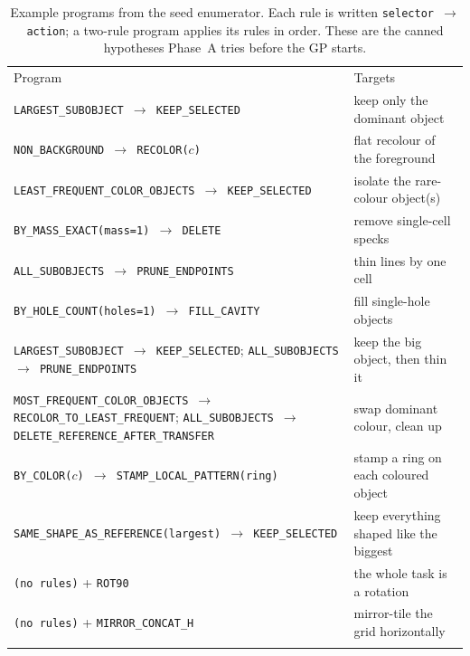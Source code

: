 \begin{table}[htbp]
\centering
\caption{Example programs from the seed enumerator. Each rule is written
\texttt{selector $\to$ action}; a two-rule program applies its rules in order. These are
the canned hypotheses Phase~A tries before the GP starts.}
\label{tab:app-gallery}
\footnotesize
\begin{tabular}{p{9.0cm}p{3.8cm}}
\hline\noalign{\smallskip}
Program & Targets \\
\noalign{\smallskip}\hline\noalign{\smallskip}
\texttt{LARGEST\_SUBOBJECT $\to$ KEEP\_SELECTED} & keep only the dominant object \\
\texttt{NON\_BACKGROUND $\to$ RECOLOR($c$)} & flat recolour of the foreground \\
\texttt{LEAST\_FREQUENT\_COLOR\_OBJECTS $\to$ KEEP\_SELECTED} & isolate the rare-colour object(s) \\
\texttt{BY\_MASS\_EXACT(mass{=}1) $\to$ DELETE} & remove single-cell specks \\
\texttt{ALL\_SUBOBJECTS $\to$ PRUNE\_ENDPOINTS} & thin lines by one cell \\
\texttt{BY\_HOLE\_COUNT(holes{=}1) $\to$ FILL\_CAVITY} & fill single-hole objects \\
\texttt{LARGEST\_SUBOBJECT $\to$ KEEP\_SELECTED};\newline
\texttt{ALL\_SUBOBJECTS $\to$ PRUNE\_ENDPOINTS} & keep the big object, then thin it \\
\texttt{MOST\_FREQUENT\_COLOR\_OBJECTS $\to$ RECOLOR\_TO\_LEAST\_FREQUENT};\newline
\texttt{ALL\_SUBOBJECTS $\to$ DELETE\_REFERENCE\_AFTER\_TRANSFER} & swap dominant colour, clean up \\
\texttt{BY\_COLOR($c$) $\to$ STAMP\_LOCAL\_PATTERN(ring)} & stamp a ring on each coloured object \\
\texttt{SAME\_SHAPE\_AS\_REFERENCE(largest) $\to$ KEEP\_SELECTED} & keep everything shaped like the biggest \\
\texttt{(no rules)} \; + \; \texttt{ROT90} & the whole task is a rotation \\
\texttt{(no rules)} \; + \; \texttt{MIRROR\_CONCAT\_H} & mirror-tile the grid horizontally \\
\noalign{\smallskip}\hline
\end{tabular}
\end{table}

